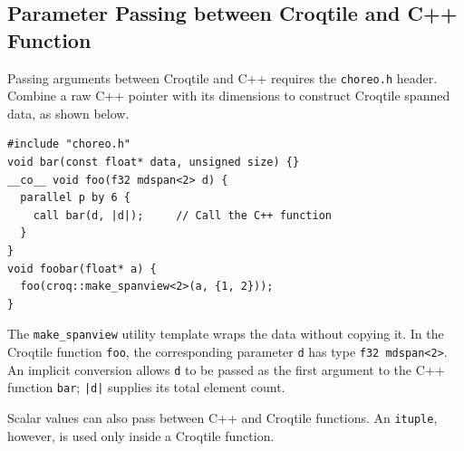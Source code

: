 \subsection*{Parameter Passing between Croqtile and C++ Function}

Passing arguments between Croqtile and C++ requires the \texttt{choreo.h} header. Combine a raw C++ pointer with its dimensions to construct Croqtile spanned data, as shown below.

\begin{lstlisting}[language=croqtile,caption={Parameter Passing between Croqtile and C Function}]
#include "choreo.h"
void bar(const float* data, unsigned size) {}
__co__ void foo(f32 mdspan<2> d) {
  parallel p by 6 {
    call bar(d, |d|);     // Call the C++ function
  }
}
void foobar(float* a) {
  foo(croq::make_spanview<2>(a, {1, 2}));
}
\end{lstlisting}

The \texttt{make\_spanview} utility template wraps the data without copying it. In the Croqtile function \texttt{foo}, the corresponding parameter \texttt{d} has type \texttt{f32 mdspan\textless{}2\textgreater{}}. An implicit conversion allows \texttt{d} to be passed as the first argument to the C++ function \texttt{bar}; \texttt{|d|} supplies its total element count.

Scalar values can also pass between C++ and Croqtile functions. An \texttt{ituple}, however, is used only inside a Croqtile function.
